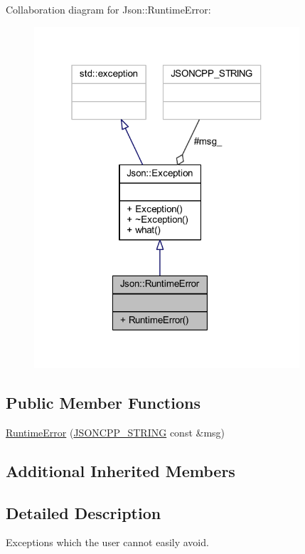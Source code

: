 Collaboration diagram for Json\+:\+:Runtime\+Error\+:\nopagebreak
\begin{figure}[H]
\begin{center}
\leavevmode
\includegraphics[width=280pt]{class_json_1_1_runtime_error__coll__graph}
\end{center}
\end{figure}
\subsection*{Public Member Functions}
\begin{DoxyCompactItemize}
\item 
\hyperlink{class_json_1_1_runtime_error_a0f6445dc345ce0a703610b6e893fee40}{Runtime\+Error} (\hyperlink{json_8h_a1e723f95759de062585bc4a8fd3fa4be}{J\+S\+O\+N\+C\+P\+P\+\_\+\+S\+T\+R\+I\+NG} const \&msg)
\end{DoxyCompactItemize}
\subsection*{Additional Inherited Members}


\subsection{Detailed Description}
Exceptions which the user cannot easily avoid.

